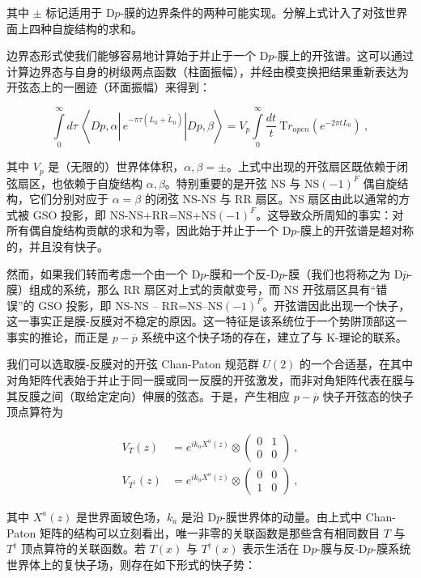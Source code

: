 \documentclass[11pt,a4paper]{ctexart}
\begin{document}
其中 \(\pm\) 标记适用于 D\(p\)-膜的边界条件的两种可能实现。分解上式计入了对弦世界面上四种自旋结构的求和。

边界态形式使我们能够容易地计算始于并止于一个 D\(p\)-膜上的开弦谱。这可以通过计算边界态与自身的树级两点函数（柱面振幅），并经由模变换把结果重新表达为开弦态上的一圈迹（环面振幅）来得到：

\[\int\limits_0^{\infty}d\tau~\left\langle Dp,\alpha\left|
\,e^{-\pi\tau(L_0+\tilde{L}_0)}\right|Dp,\beta\right\rangle
=V_p\int\limits_0^{\infty}\frac{dt}{t}~{\mathrm Tr}_{\mathrm open}\left(e^{-2\pi
    tL_0}\right) \ ,\]

其中 \(V_p\) 是（无限的）世界体体积，\(\alpha,\beta=\pm\)。上式中出现的开弦扇区既依赖于闭弦扇区，也依赖于自旋结构 \(\alpha,\beta\)。特别重要的是开弦 NS 与 NS\((-1)^F\) 偶自旋结构，它们分别对应于 \(\alpha=\beta\) 的闭弦 NS-NS 与 RR 扇区。NS 扇区由此以通常的方式被 GSO 投影，即 NS-NS+RR=NS+NS\((-1)^F\)。这导致众所周知的事实：对所有偶自旋结构贡献的求和为零，因此始于并止于一个 D\(p\)-膜上的开弦谱是超对称的，并且没有快子。

然而，如果我们转而考虑一个由一个 D\(p\)-膜和一个反-D\(p\)-膜（我们也将称之为 D\(\overline{p}\)-膜）组成的系统，那么 RR 扇区对上式的贡献变号，而 NS 开弦扇区具有``错误''的 GSO 投影，即 NS-NS -- RR=NS--NS\((-1)^F\)。开弦谱因此出现一个快子，这一事实正是膜-反膜对不稳定的原因。这一特征是该系统位于一个势阱顶部这一事实的推论，而正是 \(p-\overline{p}\) 系统中这个快子场的存在，建立了与 K-理论的联系。

我们可以选取膜-反膜对的开弦 Chan-Paton 规范群 \(U(2)\) 的一个合适基，在其中对角矩阵代表始于并止于同一膜或同一反膜的开弦激发，而非对角矩阵代表在膜与其反膜之间（取给定定向）伸展的弦态。于是，产生相应 \(p-\overline{p}\) 快子开弦态的快子顶点算符为

\[\begin{matrix}
V_T(z)&=e^{ik_aX^a(z)}\otimes\left(\begin{array}{cc}0 & 1\\ 0 &
  0\end{array}\right)\ ,\\
V_{T^\dagger}(z)&=e^{ik_aX^a(z)}\otimes\left(\begin{array}{cc}0 &
  0\\ 1 & 0\end{array}\right)\ ,
\end{matrix}\]

其中 \(X^a(z)\) 是世界面玻色场，\(k_a\) 是沿 D\(p\)-膜世界体的动量。由上式中 Chan-Paton 矩阵的结构可以立刻看出，唯一非零的关联函数是那些含有相同数目 \(T\) 与 \(T^\dagger\) 顶点算符的关联函数。若 \(T(x)\) 与 \(T^\dagger(x)\) 表示生活在 D\(p\)-膜与反-D\(p\)-膜系统世界体上的复快子场，则存在如下形式的快子势：
\end{document}

